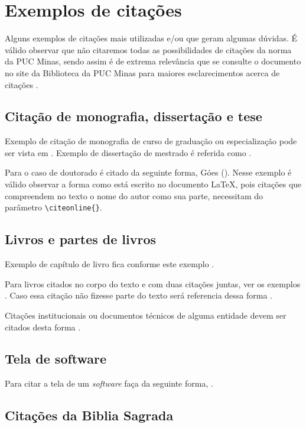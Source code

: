 \section{\esp Exemplos de citações} 

Alguns exemplos de citações mais utilizadas e/ou que geram algumas dúvidas. É válido observar que não citaremos
todas as possibilidades de citações da norma da PUC Minas, sendo assim é de extrema relevância que se consulte 
o documento no site da Biblioteca da PUC Minas para maiores esclarecimentos acerca de citações \cite{manualpuc}.

\subsection{\esp Citação de monografia, dissertação e tese}

Exemplo de citação de monografia de curso de graduação ou especialização pode ser vista em .
Exemplo de dissertação de mestrado é referida como .

Para o caso de doutorado é citado da seguinte forma, Góes (\citeyear{tese}). Nesse exemplo é válido observar a forma
como está escrito no documento \LaTeX, pois citações que compreendem no texto o nome do autor como sua parte, necessitam 
do parâmetro \verb$\citeonline{}$. 

\subsection{\esp Livros e partes de livros}

Exemplo de capítulo de livro fica conforme este exemplo \cite{cap-livro}.

Para livros citados no corpo do texto e com duas citações juntas, ver os exemplos .
Caso essa citação não fizesse parte do texto será referencia dessa forma \cite{knuth,groupp}.

Citações institucionais ou documentos técnicos de alguma entidade devem ser citados desta forma \cite{pmbok}.

\subsection{\esp Tela de software}

Para  citar a tela de um \textit{software} faça da seguinte forma, .

\subsection{\esp Citações da Biblia Sagrada}


